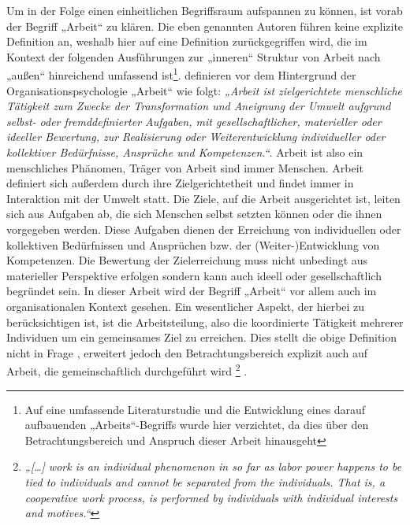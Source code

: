 Um in der Folge einen einheitlichen Begriffsraum aufspannen zu können, ist vorab der Begriff „Arbeit“ zu klären. Die eben genannten Autoren führen keine explizite Definition an, weshalb hier auf eine Definition zurückgegriffen wird, die im Kontext der folgenden Ausführungen zur „inneren“ Struktur von Arbeit nach „außen“ hinreichend umfassend ist\footnote{Auf eine umfassende Literaturstudie und die Entwicklung eines darauf aufbauenden „Arbeits“-Begriffs wurde hier verzichtet, da dies über den Betrachtungsbereich und Anspruch dieser Arbeit hinausgeht}. \citep{Semmer04} definieren vor dem Hintergrund der Organisationspsychologie „Arbeit“ wie folgt: \emph{„Arbeit ist zielgerichtete menschliche Tätigkeit zum Zwecke der Transformation und Aneignung der Umwelt aufgrund selbst- oder fremddefinierter Aufgaben, mit gesellschaftlicher, materieller oder ideeller Bewertung, zur Realisierung oder Weiterentwicklung individueller oder kollektiver Bedürfnisse, Ansprüche und Kompetenzen.“}. Arbeit ist also ein menschliches Phänomen, Träger von Arbeit sind immer Menschen. Arbeit definiert sich außerdem durch ihre Zielgerichtetheit und findet immer in Interaktion mit der Umwelt statt. Die Ziele, auf die Arbeit ausgerichtet ist, leiten sich aus Aufgaben ab, die sich Menschen selbst setzten können oder die ihnen vorgegeben werden. Diese Aufgaben dienen der Erreichung von individuellen oder kollektiven Bedürfnissen und Ansprüchen bzw. der (Weiter-)Entwicklung von Kompetenzen. Die Bewertung der Zielerreichung muss nicht unbedingt aus materieller Perspektive erfolgen sondern kann auch ideell oder gesellschaftlich begründet sein. In dieser Arbeit wird der Begriff „Arbeit“ vor allem auch im organisationalen Kontext gesehen. Ein wesentlicher Aspekt, der hierbei zu berücksichtigen ist, ist die Arbeitsteilung, also die koordinierte Tätigkeit mehrerer Individuen um ein gemeinsames Ziel zu erreichen. Dies stellt die obige Definition nicht in Frage \citep{Schmidt94}, erweitert jedoch den Betrachtungsbereich explizit auch auf Arbeit, die gemeinschaftlich durchgeführt wird \footnote{\emph{„[\ldots] work is an individual phenomenon in so far as labor power happens to be tied to individuals and cannot be separated from the individuals. That is, a cooperative work process, is performed by individuals with individual interests and motives.“}\citep[][S. 353 ]{Schmidt94}} . 

